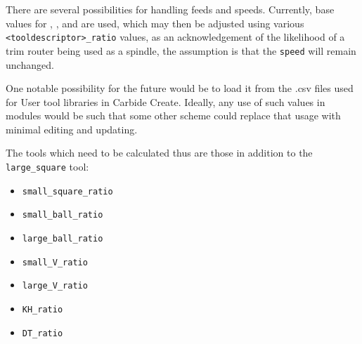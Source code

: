 \documentclass{ltxdoc}
\begin{document}
There are several possibilities for handling feeds and speeds. Currently, base values for , , and  are used, which may then be adjusted using various \verb|<tooldescriptor>_ratio| values, as an acknowledgement of the likelihood of a trim router being used as a spindle, the assumption is that the \texttt{speed} will remain unchanged.

One notable possibility for the future would be to load it from the .csv files used for User tool libraries in Carbide Create. Ideally, any use of such values in modules would be such that some other scheme could replace that usage with minimal editing and updating.

The tools which need to be calculated thus are those in addition to the \verb|large_square| tool:

\begin{itemize}
\item \verb|small_square_ratio|
\item \verb|small_ball_ratio|
\item \verb|large_ball_ratio|
\item \verb|small_V_ratio|
\item \verb|large_V_ratio|
\item \verb|KH_ratio|
\item \verb|DT_ratio|
\end{itemize}
\end{document}
